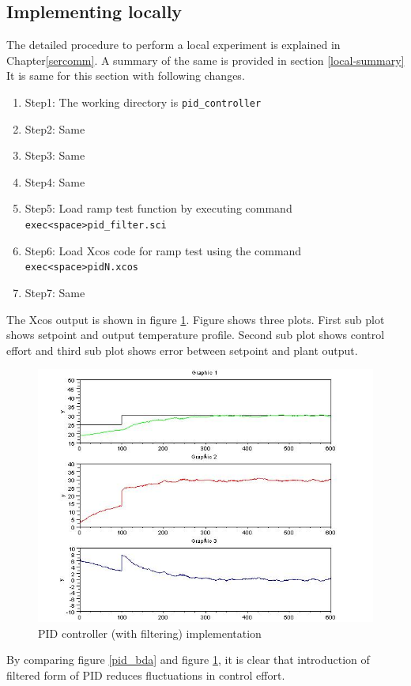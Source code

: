\subsection{Implementing locally}
The detailed procedure to perform a local experiment is explained in Chapter\ref{sercomm}. A summary of the same is provided in section \ref{local-summary} It is same for this section with following changes.

\begin{enumerate}
\item Step1: The working directory is {\tt  pid\_controller}
\item Step2: Same
\item Step3: Same
\item Step4: Same
\item Step5: Load ramp test function by executing command\\ {\tt exec<space>pid\_filter.sci}
\item Step6: Load Xcos code for ramp test using the command\\ {\tt exec<space>pidN.xcos}
\item Step7: Same
\end{enumerate}

The Xcos output is shown in figure \ref{pid_filter}.
Figure shows three plots. First sub plot shows setpoint and output temperature profile. Second sub plot shows control
effort and third sub plot shows error between setpoint and plant output.

\begin{figure}
\centering
\includegraphics[width=0.7\linewidth]{pid_manual/pid_filter.jpg}
\caption{PID controller (with filtering) implementation}
\label{pid_filter}
\end{figure}

By comparing figure \ref{pid_bda} and figure \ref{pid_filter}, it is clear that introduction of filtered form of 
PID reduces fluctuations in control effort.

